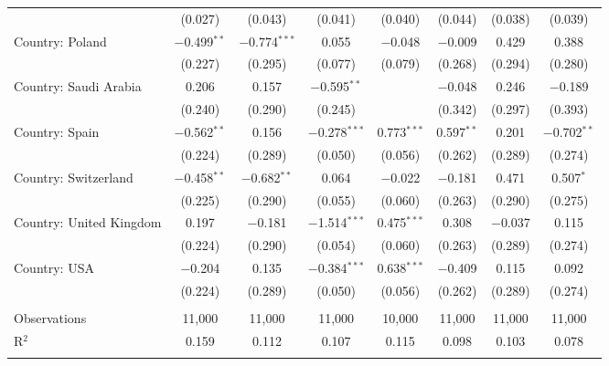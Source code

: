 \begin{tabular}{@{\extracolsep{5pt}}lccccccc}
  & (0.027) & (0.043) & (0.041) & (0.040) & (0.044) & (0.038) & (0.039) \\ 
  Country: Poland & $-$0.499$^{**}$ & $-$0.774$^{***}$ & 0.055 & $-$0.048 & $-$0.009 & 0.429 & 0.388 \\ 
  & (0.227) & (0.295) & (0.077) & (0.079) & (0.268) & (0.294) & (0.280) \\ 
  Country: Saudi Arabia & 0.206 & 0.157 & $-$0.595$^{**}$ &  & $-$0.048 & 0.246 & $-$0.189 \\ 
  & (0.240) & (0.290) & (0.245) &  & (0.342) & (0.297) & (0.393) \\ 
  Country: Spain & $-$0.562$^{**}$ & 0.156 & $-$0.278$^{***}$ & 0.773$^{***}$ & 0.597$^{**}$ & 0.201 & $-$0.702$^{**}$ \\ 
  & (0.224) & (0.289) & (0.050) & (0.056) & (0.262) & (0.289) & (0.274) \\ 
  Country: Switzerland & $-$0.458$^{**}$ & $-$0.682$^{**}$ & 0.064 & $-$0.022 & $-$0.181 & 0.471 & 0.507$^{*}$ \\ 
  & (0.225) & (0.290) & (0.055) & (0.060) & (0.263) & (0.290) & (0.275) \\ 
  Country: United Kingdom & 0.197 & $-$0.181 & $-$1.514$^{***}$ & 0.475$^{***}$ & 0.308 & $-$0.037 & 0.115 \\ 
  & (0.224) & (0.290) & (0.054) & (0.060) & (0.263) & (0.289) & (0.274) \\ 
  Country: USA & $-$0.204 & 0.135 & $-$0.384$^{***}$ & 0.638$^{***}$ & $-$0.409 & 0.115 & 0.092 \\ 
  & (0.224) & (0.289) & (0.050) & (0.056) & (0.262) & (0.289) & (0.274) \\ 
 \hline \\[-1.8ex] 

Observations & 11,000 & 11,000 & 11,000 & 10,000 & 11,000 & 11,000 & 11,000 \\ 
R$^{2}$ & 0.159 & 0.112 & 0.107 & 0.115 & 0.098 & 0.103 & 0.078 \\ 
\hline 
\hline \\[-1.8ex] 
\end{tabular} 